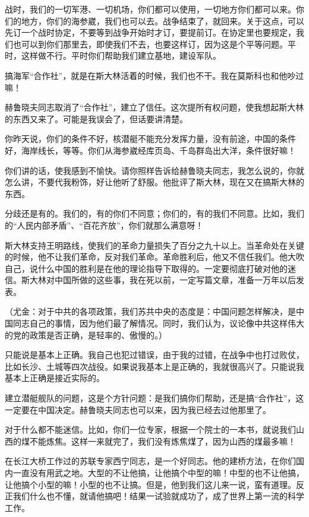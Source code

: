战时，我们的一切军港、一切机场，你们都可以使用，一切地方你们都可以来。你们的地方，你们的海参崴，我们也可以去。战争结束了，就回来。关于这点，可以先订一个战时协定，不要等到战争开始时才订，要提前订。在协定里也要规定，我们也可以到你们那里去，即使我们不去，也要这样订，因为这是个平等问题。平时，这样做不行。平时你们帮助我们建立基地，建设军队。

搞海军“合作社”，就是在斯大林活着的时候，我们也不干。我在莫斯科也和他吵过嘛！

赫鲁晓夫同志取消了“合作社”，建立了信任。这次提所有权问题，使我想起斯大林的东西又来了。可能是我误会了，但话要讲清楚。

你昨天说，你们的条件不好，核潜艇不能充分发挥力量，没有前途，中国的条件好，海岸线长，等等。你们从海参崴经库页岛、千岛群岛出大洋，条件很好嘛！

你们讲的话，使我感到不愉快。请你照样告诉给赫鲁晓夫同志，我怎么说的，你就怎么讲，不要代我粉饰，好让他听了舒服。他批评了斯大林，现在又在搞斯大林的东西。

分歧还是有的。我们的，有的你们不同意；你们的，有的我们不同意。比如，我们的“人民内部矛盾”、“百花齐放”，你们就那么满意呀！

斯大林支持王明路线，使我们的革命力量损失了百分之九十以上。当革命处在关键的时候，他不让我们革命，反对我们革命。革命胜利后，他又不信任我们。他大吹自己，说什么中国的胜利是在他的理论指导下取得的。一定要彻底打破对他的迷信。斯大林对中国所做的这些事，我在死以前，一定写篇文章，准备一万年以后发表。

（尤金：对于中共的各项政策，我们苏共中央的态度是：中国问题怎样解决，是中国同志自己的事情，因为他们最了解情况。同时，我们认为，议论像中共这样伟大的党的政策是否正确，是轻率的、傲慢的。）

只能说是基本上正确。我自己也犯过错误，由于我的过错，在战争中也打过败仗，比如长沙、土城等四次战役。如果说我基本上是正确的，我就很高兴了。只能说我基本上正确是接近实际的。

建立潜艇舰队的问题，这是个方针问题：是我们搞你们帮助，还是搞“合作社”，这一定要在中国决定。赫鲁晓夫同志也可以来，因为我已经去过他那里了。

对于什么都不能迷信。比如，你们一位专家，根据一个院士的一本书，就说我们山西的煤不能炼焦。这样一来就完了，我们没有炼焦煤了，因为山西的煤最多嘛！

在长江大桥工作过的苏联专家西宁同志，是一个好同志。他的建桥方法，在你们国内一直没有用武之地。大型的不让他搞，让他搞个中型的嘛！中型的也不让他搞，让他搞个小型的嘛！小型的也不让搞。但是，他到我们这儿来一说，蛮有道理。反正我们什么也不懂，就请他搞吧！结果一试验就成功了，成了世界上第一流的科学工作。

